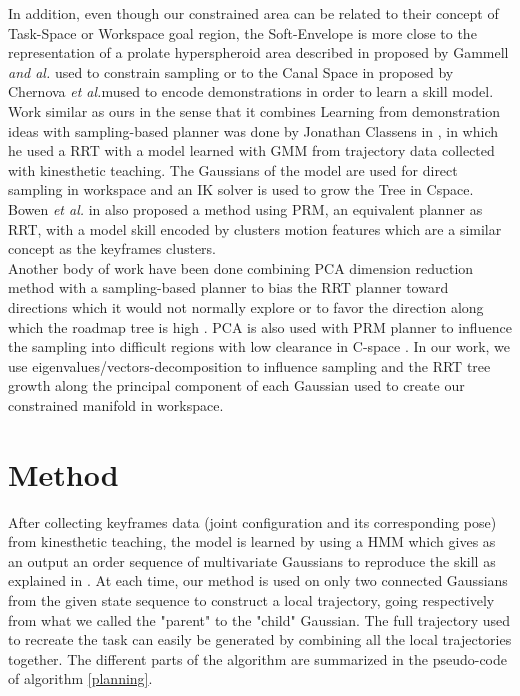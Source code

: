 \documentclass[letterpaper, 10 pt, conference]{ieeeconf}  %
\begin{document}
In addition, even though our constrained area can be related to their concept of Task-Space or Workspace goal region, the Soft-Envelope is more close to the representation of a prolate hyperspheroid area described in \cite{informedRRTStar} proposed by Gammell \textit{and al.} used to constrain sampling or to the Canal Space in \cite{CanalSpace} proposed by Chernova \textit{et al.}mused to encode demonstrations in order to learn a skill model.\\
Work similar as ours in the sense that it combines Learning from demonstration ideas with sampling-based planner was done by Jonathan Classens in  \cite{RRTandLFD}, in which he used a RRT with a model learned with GMM from trajectory data collected with kinesthetic teaching. The Gaussians of the model are used for direct sampling in workspace and an IK solver is used to grow the Tree in Cspace. Bowen \textit{et al.} in \cite{ModelAndPRM} also proposed a method using PRM, an equivalent planner as RRT, with a model skill encoded by clusters motion features which are a similar concept as the keyframes clusters.\\
Another body of work have been done combining PCA dimension reduction method with a sampling-based planner to bias the RRT planner toward directions which it would not normally explore \cite{balancing_statespace_coveragePCA} or to favor the direction along which the roadmap tree is high \cite{PCARRT2}. PCA is also used with PRM planner to influence the sampling into difficult regions with low clearance in C-space \cite{PCA_PRM}. In our work, we use eigenvalues/vectors-decomposition to influence sampling and the RRT tree growth along the principal component of each Gaussian used to create our constrained manifold in workspace.


\section{Method}
After collecting keyframes data (joint configuration and its corresponding pose) from kinesthetic teaching, the model is learned by using a HMM which gives as an output an order sequence of multivariate Gaussians to reproduce the skill as explained in \cite{KeyframesSelfImprovementLearning}.
 At each time, our method is used on only two connected Gaussians from the given state sequence to construct a local trajectory, going respectively from what we called the "parent" to the "child" Gaussian. The full trajectory used to recreate the task can easily be generated by combining all the local trajectories together.
The different parts of the algorithm are summarized in the pseudo-code of algorithm \ref{planning}. \\
\end{document}
